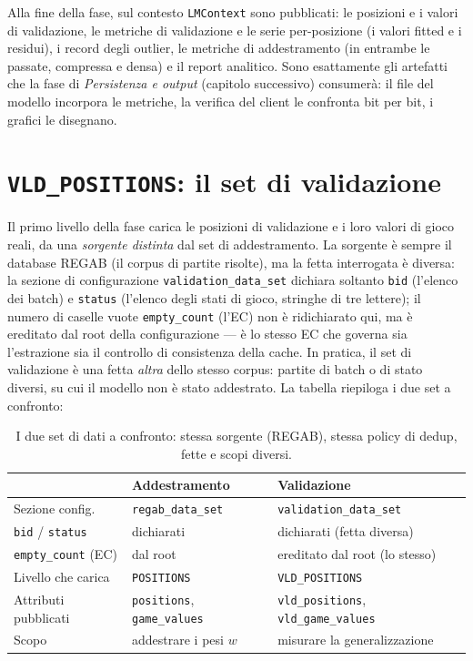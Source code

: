 Alla fine della fase, sul contesto \texttt{LMContext} sono pubblicati: le
posizioni e i valori di validazione, le metriche di validazione e le serie
per-posizione (i valori fitted e i residui), i record degli outlier, le
metriche di addestramento (in entrambe le passate, compressa e densa) e il
report analitico. Sono esattamente gli artefatti che la fase di
\emph{Persistenza e output} (capitolo successivo) consumerà: il file del
modello incorpora le metriche, la verifica del client le confronta bit per
bit, i grafici le disegnano.

\section{\texttt{VLD\_POSITIONS}: il set di validazione}

Il primo livello della fase carica le posizioni di validazione e i loro valori
di gioco reali, da una \emph{sorgente distinta} dal set di addestramento. La
sorgente è sempre il database REGAB (il corpus di partite risolte), ma la
fetta interrogata è diversa: la sezione di configurazione
\texttt{validation\_data\_set} dichiara soltanto \texttt{bid} (l'elenco dei
batch) e \texttt{status} (l'elenco degli stati di gioco, stringhe di tre
lettere); il numero di caselle vuote \texttt{empty\_count} (l'EC) non è
ridichiarato qui, ma è ereditato dal root della configurazione — è lo stesso
EC che governa sia l'estrazione sia il controllo di consistenza della cache.
In pratica, il set di validazione è una fetta \emph{altra} dello stesso
corpus: partite di batch o di stato diversi, su cui il modello non è stato
addestrato. La tabella riepiloga i due set a confronto:

\begin{table}[htbp]
\centering
\small
\begin{tabular}{lll}
\toprule
 & \textbf{Addestramento} & \textbf{Validazione} \\
\midrule
Sezione config.     & \texttt{regab\_data\_set} & \texttt{validation\_data\_set} \\
\texttt{bid} / \texttt{status} & dichiarati & dichiarati (fetta diversa) \\
\texttt{empty\_count} (EC) & dal root & ereditato dal root (lo stesso) \\
Livello che carica  & \texttt{POSITIONS} & \texttt{VLD\_POSITIONS} \\
Attributi pubblicati & \texttt{positions}, \texttt{game\_values} & \texttt{vld\_positions}, \texttt{vld\_game\_values} \\
Scopo & addestrare i pesi $w$ & misurare la generalizzazione \\
\bottomrule
\end{tabular}
\caption{I due set di dati a confronto: stessa sorgente (REGAB), stessa
policy di dedup, fette e scopi diversi.}
\label{tab:train-vld}
\end{table}

